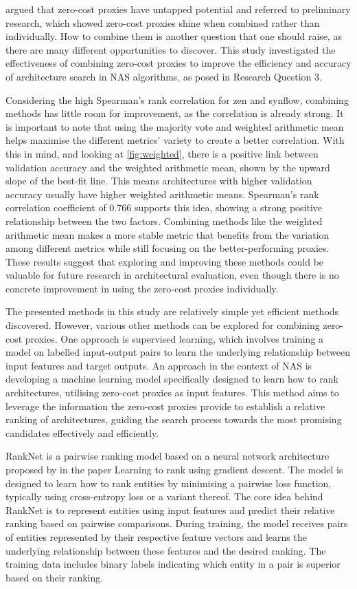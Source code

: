 \cite{colin2022adeeperlook} argued that zero-cost proxies have untapped potential and referred to preliminary research, which showed zero-cost proxies shine when combined rather than individually. How to combine them is another question that one should raise, as there are many different opportunities to discover. This study investigated the effectiveness of combining zero-cost proxies to improve the efficiency and accuracy of architecture search in \gls{NAS} algorithms, as posed in Research Question 3. 

Considering the high Spearman's rank correlation for zen and \gls{synflow}, combining methods has little room for improvement, as the correlation is already strong. It is important to note that using the majority vote and weighted arithmetic mean helps maximise the different metrics' variety to create a better correlation. With this in mind, and looking at \cref{fig:weighted}, there is a positive link between validation accuracy and the weighted arithmetic mean, shown by the upward slope of the best-fit line. This means architectures with higher validation accuracy usually have higher weighted arithmetic means. Spearman's rank correlation coefficient of $0.766$ supports this idea, showing a strong positive relationship between the two factors. Combining methods like the weighted arithmetic mean makes a more stable metric that benefits from the variation among different metrics while still focusing on the better-performing proxies. These results suggest that exploring and improving these methods could be valuable for future research in architectural evaluation, even though there is no concrete improvement in using the zero-cost proxies individually. 

The presented methods in this study are relatively simple yet efficient methods discovered. However, various other methods can be explored for combining zero-cost proxies. One approach is supervised learning,  which involves training a model on labelled input-output pairs to learn the underlying relationship between input features and target outputs. An approach in the context of \gls{NAS} is developing a machine learning model specifically designed to learn how to rank architectures, utilising zero-cost proxies as input features. This method aims to leverage the information the zero-cost proxies provide to establish a relative ranking of architectures, guiding the search process towards the most promising candidates effectively and efficiently. 

RankNet is a pairwise ranking model based on a neural network architecture proposed by \cite{burges2005learning} in the paper Learning to rank using gradient descent. The model is designed to learn how to rank entities by minimising a pairwise loss function, typically using cross-entropy loss or a variant thereof. The core idea behind RankNet is to represent entities using input features and predict their relative ranking based on pairwise comparisons. During training, the model receives pairs of entities represented by their respective feature vectors and learns the underlying relationship between these features and the desired ranking. The training data includes binary labels indicating which entity in a pair is superior based on their ranking.

